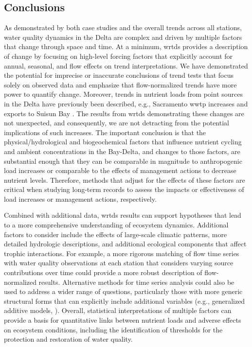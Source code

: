 \documentclass[letterpaper,12pt,oneside]{article}\usepackage[]{graphicx}\usepackage[]{color}
\begin{document}
\subsection{Conclusions}

As demonstrated by both case studies and the overall trends across all stations, water quality dynamics in the Delta are complex and driven by multiple factors that change through space and time.  At a minimum, \ac{wrtds} provides a description of change by focusing on high-level forcing factors that explicitly account for annual, seasonal, and flow effects on trend interpretations.  We have demonstrated the potential for imprecise or inaccurate conclusions of trend tests that focus solely on observed data and emphasize that flow-normalized trends have more power to quantify change.  Moreover, trends in nutrient loads from point sources in the Delta have previously been described, e.g., Sacramento \ac{wwtp} increases \citep{Jassby08} and exports to Suisun Bay \citep{Novick14}. The results from \ac{wrtds} demonstrating these changes are not unexpected, and consequently, we are not detracting from the potential implications of such increases. The important conclusion is that the physical/hydrological and biogeochemical factors that influence nutrient cycling and ambient concentrations in the Bay-Delta, and changes to those factors, are substantial enough that they can be comparable in magnitude to anthropogenic load increases or comparable to the effects of management actions to decrease nutrient levels. Therefore, methods that adjust for the effects of these factors are critical when studying long-term records to assess the impacts or effectiveness of load increases or management actions, respectively.

Combined with additional data, \ac{wrtds} results can support hypotheses that lead to a more comprehensive understanding of ecosystem dynamics. Additional factors to consider include the effects of large-scale climatic patterns, more detailed hydrologic descriptions, and additional ecological components that affect trophic interactions.  For example, a more rigorous matching of flow time series with water quality observations at each station that considers varying source contributions over time could provide a more robust description of flow-normalized results.  Alternative methods for time series analysis could also be used to address a wider range of questions, particularly those with more generic structural forms that can explicitly include additional variables (e.g., generalized additive models, \cite{Beck17}).  Overall, statistical interpretations of multiple factors can provide a basis for quantitative links between nutrient loads and adverse effects on ecosystem conditions, including the identification of thresholds for the protection and restoration of water quality. 
\end{document}
